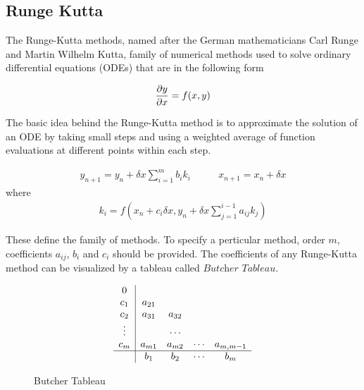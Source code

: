 \documentclass[a4paper,oneside,12pt]{report}
\numberwithin{equation}{chapter}
\begin{document}
\subsection{Runge Kutta} \label{sec:rungekutta}

The Runge-Kutta methods, named after the German mathematicians Carl Runge and Martin Wilhelm Kutta, family of numerical methods
used to solve ordinary differential equations (ODEs) that are in the following form

\begin{equation} \label{eq:first-order-ODE}
    \frac{\partial y}{\partial x} = f(x, y)
\end{equation}


The basic idea behind the Runge-Kutta method is to approximate the solution of an ODE by taking small steps and using a weighted average 
of function evaluations at different points within each step.

\begin{equation} \label{eq:general-rk}
    \begin{aligned}
        y_{n+1} = y_n + \delta x \sum_{i=1}^{m} b_i k_i
    \end{aligned}
    \qquad
    \begin{aligned}
        x_{n+1} = x_n + \delta x 
    \end{aligned}
\end{equation}
where 
\begin{eqnarray} \label{eq:general-rk-coef}
    k_i = f(x_n + c_i \delta x, y_n + \delta x \sum_{j = 1}^{i - 1}a_{ij}k_j)
\end{eqnarray}

These  define the family of methods. To specify a perticular method, order $m$, coefficients $a_{ij}$, $b_i$ and $c_i$ should be provided.
The coefficients of any Runge-Kutta method can be visualized by a tableau called $\textit{Butcher Tableau}$.

\begin{figure}[h!]
    \[ 
    \begin{array} 
        {c|cccc}
        0\\
        c_1 & a_{21} \\
        c_2 & a_{31} & a_{32}\\
        \vdots& & \cdots& \\
        c_m & a_{m1} & a_{m2} & \cdots & a_{m,m-1}\\
        \hline
        & b_1 & b_2 &\cdots & b_m
    \end{array}
    \]
    \caption{Butcher Tableau}
    \label{fig:Butcher}
\end{figure}
\end{document}
